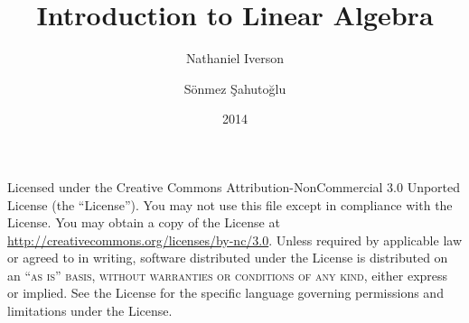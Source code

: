 \documentclass[12pt,fleqn]{fancybook} %
\author{Nathaniel Iverson
\and
S\"{o}nmez \c{S}ahuto\u{g}lu}
\title{Introduction to Linear Algebra}
\date{2014}
\begin{document}
\frontmatter

\maketitle

\begin{copyrightpage}
\noindent Licensed under the Creative Commons Attribution-NonCommercial 3.0 Unported License (the ``License''). You may not use this file except in compliance with the License. You may obtain a copy of the License at \url{http://creativecommons.org/licenses/by-nc/3.0}. Unless required by applicable law or agreed to in writing, software distributed under the License is distributed on an \textsc{``as is'' basis, without warranties or conditions of any kind}, either express or implied. See the License for the specific language governing permissions and limitations under the License.\\ %
\end{copyrightpage}

\tableofcontents

\mainmatter


\appendix


%

\backmatter

\nocite{*}


\end{document}
